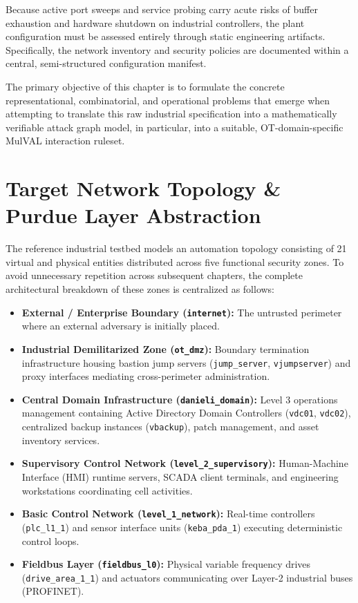 \documentclass[target=mst,aauheader=aics,style=]{thud}
\begin{document}
Because active port sweeps and service probing carry acute risks of buffer exhaustion and hardware shutdown on industrial controllers, the plant configuration must be assessed entirely through static engineering artifacts. Specifically, the network inventory and security policies are documented within a central, semi-structured configuration manifest. 

The primary objective of this chapter is to formulate the concrete representational, combinatorial, and operational problems that emerge when attempting to translate this raw industrial specification into a mathematically verifiable attack graph model, in particular, into a suitable, OT-domain-specific MulVAL interaction ruleset.

\section{Target Network Topology \& Purdue Layer Abstraction}
\label{sec:danieli_topology_overview}
The reference industrial testbed models an automation topology consisting of 21 virtual and physical entities distributed across five functional security zones. To avoid unnecessary repetition across subsequent chapters, the complete architectural breakdown of these zones is centralized as follows:

\begin{itemize}
    \item \textbf{External / Enterprise Boundary (\texttt{internet}):} The untrusted perimeter where an external adversary is initially placed.
    \item \textbf{Industrial Demilitarized Zone (\texttt{ot\_dmz}):} Boundary termination infrastructure housing bastion jump servers (\texttt{jump\_server}, \texttt{vjumpserver}) and proxy interfaces mediating cross-perimeter administration.
    \item \textbf{Central Domain Infrastructure (\texttt{danieli\_domain}):} Level 3 operations management containing Active Directory Domain Controllers (\texttt{vdc01}, \texttt{vdc02}), centralized backup instances (\texttt{vbackup}), patch management, and asset inventory services.
    \item \textbf{Supervisory Control Network (\texttt{level\_2\_supervisory}):} Human-Machine Interface (HMI) runtime servers, SCADA client terminals, and engineering workstations coordinating cell activities.
    \item \textbf{Basic Control Network (\texttt{level\_1\_network}):} Real-time controllers (\texttt{plc\_l1\_1}) and sensor interface units (\texttt{keba\_pda\_1}) executing deterministic control loops.
    \item \textbf{Fieldbus Layer (\texttt{fieldbus\_l0}):} Physical variable frequency drives (\texttt{drive\_area\_1\_1}) and actuators communicating over Layer-2 industrial buses (PROFINET).
\end{itemize}
\end{document}
